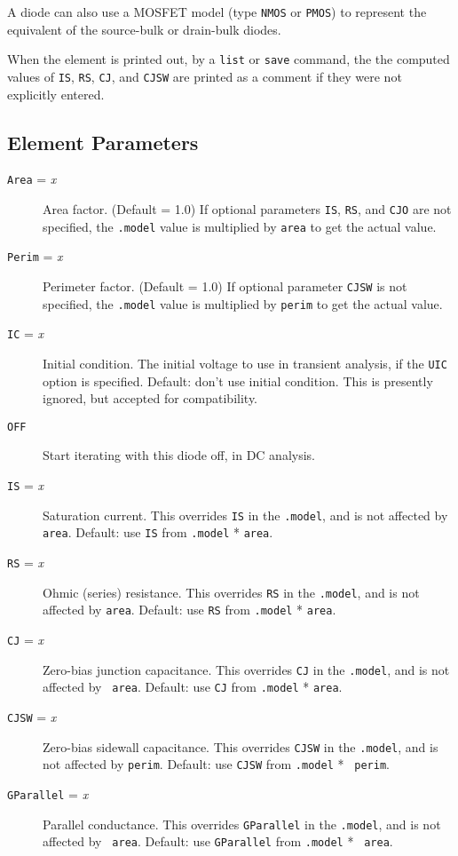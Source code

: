 A diode can also use a MOSFET model (type {\tt NMOS} or {\tt PMOS}) to
represent the equivalent of the source-bulk or drain-bulk diodes.

When the element is printed out, by a {\tt list} or {\tt save}
command, the the computed values of {\tt IS}, {\tt RS}, {\tt CJ}, and
{\tt CJSW} are printed as a comment if they were not explicitly
entered.
\subsection{Element Parameters}

\begin{description}
  
\item[{\tt Area} = {\it x}] Area factor.  (Default = 1.0) If optional
  parameters {\tt IS}, {\tt RS}, and {\tt CJO} are not specified, the
  {\tt .model} value is multiplied by {\tt area} to get the actual
  value.
  
\item[{\tt Perim} = {\it x}] Perimeter factor.  (Default = 1.0) If
  optional parameter {\tt CJSW} is not specified, the {\tt .model}
  value is multiplied by {\tt perim} to get the actual value.
  
\item[{\tt IC} = {\it x}] Initial condition.  The initial voltage to
  use in transient analysis, if the {\tt UIC} option is specified.
  Default: don't use initial condition.  This is presently ignored,
  but accepted for compatibility.
  
\item[{\tt OFF}] Start iterating with this diode off, in DC analysis.
  
\item[{\tt IS} = {\it x}] Saturation current.  This overrides {\tt IS}
  in the {\tt .model}, and is not affected by {\tt area}.  Default:
  use {\tt IS} from {\tt .model} * {\tt area}.
  
\item[{\tt RS} = {\it x}] Ohmic (series) resistance.  This overrides
  {\tt RS} in the {\tt .model}, and is not affected by {\tt area}.
  Default: use {\tt RS} from {\tt .model} * {\tt area}.
  
\item[{\tt CJ} = {\it x}] Zero-bias junction capacitance.  This
  overrides {\tt CJ} in the {\tt .model}, and is not affected by {\tt
    area}.  Default: use {\tt CJ} from {\tt .model} * {\tt area}.
  
\item[{\tt CJSW} = {\it x}] Zero-bias sidewall capacitance.  This
  overrides {\tt CJSW} in the {\tt .model}, and is not affected by
  {\tt perim}.  Default: use {\tt CJSW} from {\tt .model} * {\tt
    perim}.
  
\item[{\tt GParallel} = {\it x}] Parallel conductance.  This overrides
  {\tt GParallel} in the {\tt .model}, and is not affected by {\tt
    area}.  Default: use {\tt GParallel} from {\tt .model} * {\tt
    area}.

\end{description}
